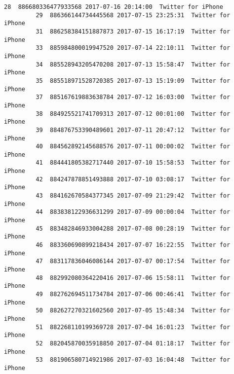 \documentclass[11pt]{article}
\begin{document}
\begin{Verbatim}[commandchars=\\\{\}]
         28  886680336477933568 2017-07-16 20:14:00  Twitter for iPhone   
         29  886366144734445568 2017-07-15 23:25:31  Twitter for iPhone   
         31  886258384151887873 2017-07-15 16:17:19  Twitter for iPhone   
         33  885984800019947520 2017-07-14 22:10:11  Twitter for iPhone   
         34  885528943205470208 2017-07-13 15:58:47  Twitter for iPhone   
         35  885518971528720385 2017-07-13 15:19:09  Twitter for iPhone   
         37  885167619883638784 2017-07-12 16:03:00  Twitter for iPhone   
         38  884925521741709313 2017-07-12 00:01:00  Twitter for iPhone   
         39  884876753390489601 2017-07-11 20:47:12  Twitter for iPhone   
         40  884562892145688576 2017-07-11 00:00:02  Twitter for iPhone   
         41  884441805382717440 2017-07-10 15:58:53  Twitter for iPhone   
         42  884247878851493888 2017-07-10 03:08:17  Twitter for iPhone   
         43  884162670584377345 2017-07-09 21:29:42  Twitter for iPhone   
         44  883838122936631299 2017-07-09 00:00:04  Twitter for iPhone   
         45  883482846933004288 2017-07-08 00:28:19  Twitter for iPhone   
         46  883360690899218434 2017-07-07 16:22:55  Twitter for iPhone   
         47  883117836046086144 2017-07-07 00:17:54  Twitter for iPhone   
         48  882992080364220416 2017-07-06 15:58:11  Twitter for iPhone   
         49  882762694511734784 2017-07-06 00:46:41  Twitter for iPhone   
         50  882627270321602560 2017-07-05 15:48:34  Twitter for iPhone   
         51  882268110199369728 2017-07-04 16:01:23  Twitter for iPhone   
         52  882045870035918850 2017-07-04 01:18:17  Twitter for iPhone   
         53  881906580714921986 2017-07-03 16:04:48  Twitter for iPhone   
         

\end{Verbatim}
\end{document}
